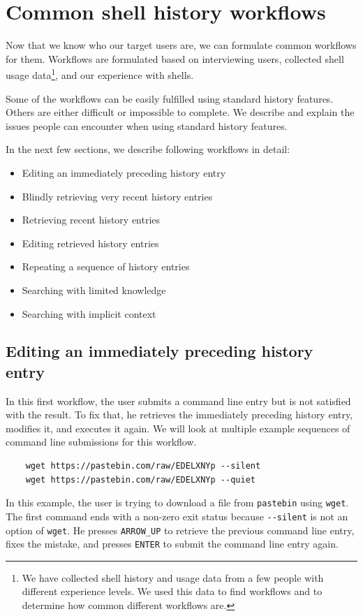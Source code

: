 \section{Common shell history workflows}

Now that we know who our target users are, we can formulate common workflows for them. Workflows are formulated based on interviewing users, collected shell usage data\footnote{We have collected shell history and usage data from a few people with different experience levels. We used this data to find workflows and to determine how common different workflows are.}, and our experience with shells. 

Some of the workflows can be easily fulfilled using standard history features. Others are either difficult or impossible to complete. We describe and explain the issues people can encounter when using standard history features. 

\newpage
In the next few sections, we describe following workflows in detail:


\begin{itemize}
    \item Editing an immediately preceding history entry
    \item Blindly retrieving very recent history entries
    \item Retrieving recent history entries
    \item Editing retrieved history entries
    \item Repeating a sequence of history entries
    \item Searching with limited knowledge
    \item Searching with implicit context
\end{itemize}


\subsection{Editing an immediately preceding history entry}

In this first workflow, the user submits a command line entry but is not satisfied with the result. To fix that, he retrieves the immediately preceding history entry, modifies it, and executes it again. We will look at multiple example sequences of command line submissions for this workflow.

\begin{verbatim}
    wget https://pastebin.com/raw/EDELXNYp --silent
    wget https://pastebin.com/raw/EDELXNYp --quiet
\end{verbatim}
In this example, the user is trying to download a file from \verb|pastebin| using \verb|wget|. The first command ends with a non-zero exit status because \verb|--silent| is not an option of \verb|wget|. He presses \verb|ARROW_UP| to retrieve the previous command line entry, fixes the mistake, and presses \verb|ENTER| to submit the command line entry again. 

